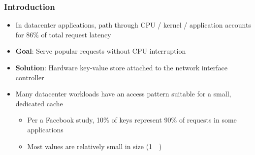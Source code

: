 \frametitle{Introduction}

\begin{itemize}
    \item In datacenter applications, path through CPU / kernel / application
        accounts for 86\% of total request latency
    \item \textbf{Goal}: Serve popular requests without CPU interruption
    \item \textbf{Solution}: Hardware key-value store attached to the network
        interface controller
    \item Many datacenter workloads have an access pattern suitable for a small, dedicated cache
        \begin{itemize}
            \item Per a Facebook study, 10\% of keys represent 90\% of requests in some applications
            \item Most values are relatively small in size (\SI{1}{\kilo\byte})
        \end{itemize}
\end{itemize}
